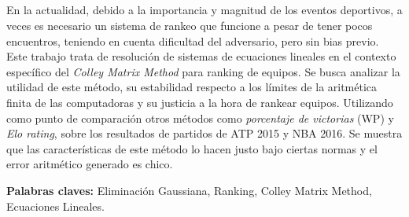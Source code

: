 \begin{addmargin}[5em]{5em}
\section*{\centering \runtitulo}

\noindent En la actualidad, debido a la importancia y magnitud de los eventos deportivos, a veces es necesario un sistema de rankeo que funcione a pesar de tener pocos encuentros, teniendo en cuenta dificultad del adversario, pero sin bias previo. Este trabajo trata de resolución de sistemas de ecuaciones lineales en el contexto específico del \textit{Colley Matrix Method} para ranking de equipos. 
Se busca analizar la utilidad de este método, su estabilidad respecto a los límites de la aritmética finita de las computadoras y su justicia a la hora de rankear equipos. Utilizando como punto de comparación otros métodos como \textit{porcentaje de victorias} (WP) y \textit{Elo rating}, sobre los resultados de partidos de ATP 2015 y NBA 2016.
Se muestra que las características de este método lo hacen justo bajo ciertas normas y el error aritmético generado es chico.

\bigskip

\noindent\textbf{Palabras claves:} Eliminación Gaussiana, Ranking, Colley Matrix Method, Ecuaciones Lineales.
\end{addmargin}